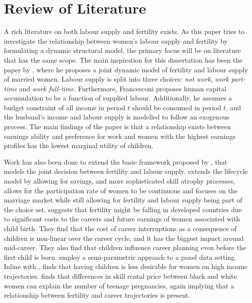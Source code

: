 \section{Review of Literature}\label{sec:lit_review}

A rich literature on both labour supply and fertility exists. As this paper tries to investigate the relationship between women's labour supply and fertility by formulating a dynamic  structural model, the primary focus will be on literature that has the same scope. The main inspiration for this dissertation has been the paper by \textcite{francesconi_joint_2002}, where he proposes a joint dynamic model of fertility and labour supply of married women. Labour supply is split into three choices: \textit{not work}, \textit{work part-time} and \textit{work full-time}. Furthermore, Francesconi proposes human capital accumulation to be a function of supplied labour. Additionally, he assumes a budget constraint of all income in period $t$ should be consumed in period $t$, and the husband's income and labour supply is modelled to follow an exogenous process. The main findings of the paper is that a relationship exists between earnings ability and preference for work and women with the highest earnings profiles has the lowest marginal utility of children.

Work has also been done to extend the basic framework proposed by \textcite{francesconi_joint_2002}, that models the joint decision between fertility and labour supply.  \textcite{adda_career_2011} extends the lifecycle model by allowing for savings, and more sophisticated skill atrophy processes, \textcite{gayle_life-cyle_2006} allows for the participation rate of women to be continuous and \textcite{keane_role_2010} focuses on the marriage market while still allowing for fertility and labour supply being part of the choice set. \textcite{adda_career_2011} suggests that fertility might be falling in developed countries due to significant costs to the careers and future earnings of women associated with child birth. They find that the cost of career interruptions as a consequence of children is non-linear over the career cycle, and it has the biggest impact around mid-career. They also find that children influence career planning even before the first child is born. \textcite{gayle_life-cyle_2006} employ a semi-parametric approach to a panel data setting. Inline with \textcite{francesconi_joint_2002}, \textcite{gayle_life-cyle_2006} finds that having children is less desirable for women on high income trajectories. \textcite{keane_role_2010} finds that differences in skill rental price between black and white women can explain the number of teenage pregnancies, again implying that a relationship between fertility and career trajectories is present.

